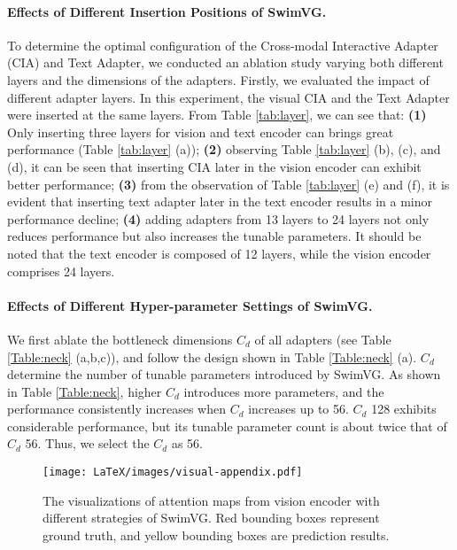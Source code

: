 \paragraph{Effects of Different Insertion Positions of SwimVG.} To determine the optimal configuration of the Cross-modal Interactive Adapter (CIA) and Text Adapter, we conducted an ablation study varying both different layers and the dimensions of the adapters. Firstly, we evaluated the impact of different adapter layers. In this experiment, the visual CIA and the Text Adapter were inserted at the same layers. From Table \ref{tab:layer}, we can see that: \textbf{(1)} Only inserting three layers for vision and text encoder can brings great performance (Table \ref{tab:layer} (a)); \textbf{(2)} observing Table \ref{tab:layer} (b), (c), and (d), it can be seen that inserting CIA later in the vision encoder can exhibit better performance; \textbf{(3)} 
from the observation of Table \ref{tab:layer} (e) and (f), it is evident that inserting text adapter later in the text encoder results in a minor performance decline; \textbf{(4)} 
adding adapters from 13 layers to 24 layers not only reduces performance but also increases the tunable parameters. It should be noted that the text encoder is composed of 12 layers, while the vision encoder comprises 24 layers.








\paragraph{Effects of Different Hyper-parameter Settings of SwimVG.} We first ablate the bottleneck dimensions $C_d$ of all adapters (see Table \ref{Table:neck} (a,b,c)), and follow the design shown in Table \ref{Table:neck} (a). $C_d$ determine the number of tunable parameters introduced by SwimVG. As shown in Table \ref{Table:neck}, higher $C_d$ introduces more parameters, and the performance consistently increases when $C_d$ increases up to 56. $C_d$ 128 exhibits considerable performance, but its tunable parameter count is about twice that of $C_d$ 56. Thus, we select the $C_d$ as 56. 


\begin{figure*}[t]
\centering
\texttt{[image: LaTeX/images/visual-appendix.pdf]}
\caption{The visualizations of attention maps from vision encoder with different strategies of SwimVG. Red bounding boxes represent ground truth, and yellow bounding boxes are prediction results.}
\vspace{-4mm}
\label{fig:more visualizations}
\end{figure*}






